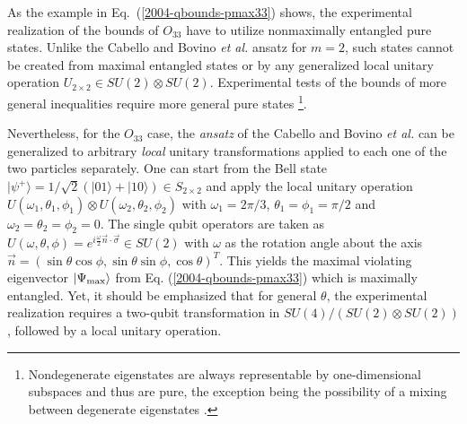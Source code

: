 \documentclass[prl,showpacs,showkeys,amsfonts,amsmath,twocolumn]{revtex4}
\newcommand{\ket}[1]{|#1\rangle}
\begin{document}
As the example in Eq.~(\ref{2004-qbounds-pmax33}) shows,
the experimental realization of the bounds of $O_{33}$ have to utilize nonmaximally entangled pure states.
Unlike the
Cabello \cite{cabello-2003a} and Bovino \emph{et al.} \cite{bovino-2003} ansatz for $m=2$,
such states cannot be
created from maximal entangled states
or by any generalized local unitary
operation $U_{2\times 2} \in SU(2) \otimes SU(2)$.
Experimental tests of the bounds of more general inequalities require
more general pure states
\footnote{
Nondegenerate eigenstates are always representable by one-dimensional subspaces
and thus are pure, the exception being the possibility of a mixing between
degenerate eigenstates \cite{braunstein92}.}.



Nevertheless,
for the $O_{33}$ case,
the {\it ansatz} of the Cabello \cite{cabello-2003a} and Bovino \emph{et al.} \cite{bovino-2003}
can be generalized to arbitrary {\em local}
unitary transformations applied to each one of the two particles separately.
One can start from the Bell state
$\ket{\psi^+} = 1/\sqrt{2}(\ket{01} + \ket{10}) \in S_{2\times 2}$ and
apply the local unitary operation $U(\omega_1,\theta_1,\phi_1)\otimes
U(\omega_2,\theta_2,\phi_2)$ with $\omega_1 =2\pi/3$,
$\theta_1=\phi_1=\pi/2$ and $\omega_2=\theta_2=\phi_2=0$. The single
qubit operators are taken as $U(\omega,\theta,\phi) =
e^{i\frac{\omega}{2} \vec{n}\cdot\vec{\sigma}} \in SU(2)$ with
$\omega$ as the rotation angle about the axis $\vec{n}=
(\sin\theta\cos\phi,\sin\theta\sin\phi,\cos\theta)^T$.
This yields the maximal violating eigenvector
$\ket{\Psi_{\rm max}}$ from
Eq. (\ref{2004-qbounds-pmax33}) which is maximally entangled.
Yet, it should be emphasized that for
general $\theta$, the experimental realization requires a two-qubit transformation in
$SU(4)/(SU(2)\otimes SU(2))$, followed by a local
unitary operation.
\end{document}
